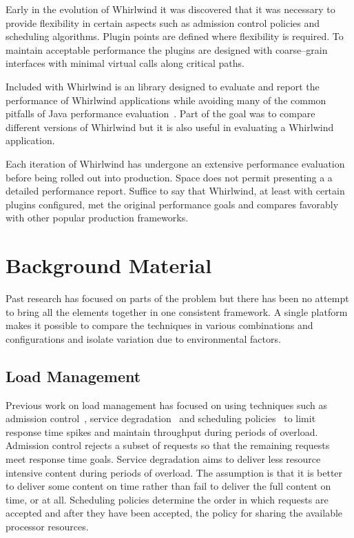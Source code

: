 \documentclass[conference]{IEEEtran}
\begin{document}
Early in the evolution of Whirlwind it was discovered that it was necessary to provide flexibility in certain aspects such as admission control policies and scheduling algorithms. Plugin points are defined where flexibility is required. To maintain acceptable performance the plugins are designed with coarse--grain interfaces with minimal virtual calls along critical paths. 

Included with Whirlwind is an library designed to evaluate and report the performance of Whirlwind applications while avoiding many of the common pitfalls of Java performance evaluation~\cite{Blackburn:EvaluationMethodology,Georges:JavaPerformance}. Part of the goal was to compare different versions of Whirlwind but it is also useful in evaluating a Whirlwind application.

Each iteration of Whirlwind has undergone an extensive performance evaluation before being rolled out into production. Space does not permit presenting a a detailed performance report. Suffice to say that Whirlwind, at least with certain plugins configured, met the original performance goals and compares favorably with other popular production frameworks.

\section{Background Material}

Past research has focused on parts of the problem but there has been no attempt to bring all the elements together in one consistent framework. A single platform makes it possible to compare the techniques in various combinations and configurations and isolate variation due to environmental factors.

\subsection{Load Management}

Previous work on load management has focused on using techniques such as admission control~\cite{Voigt:2001qe,Cherkasova:2002yb,srinivas00webk,Kanodia:2000qv,welsh03Adaptive,Elnikety:2004ty}, service degradation~\cite{welsh03Adaptive,abdelzaher99web} and scheduling policies~\cite{Zhou06RequestAware,Behren03Capriccio,Schroeder06Overload,Crovella99Alpha,Cherkasova1998Strategy,Larus:2002:Cohort} to limit response time spikes and maintain throughput during periods of overload. Admission control rejects a subset of requests so that the remaining requests meet response time goals. Service degradation aims to deliver less resource intensive content during periods of overload. The assumption is that it is better to deliver some content on time rather than fail to deliver the full content on time, or at all. Scheduling policies determine the order in which requests are accepted and after they have been accepted, the policy for sharing the available processor resources.
\end{document}
